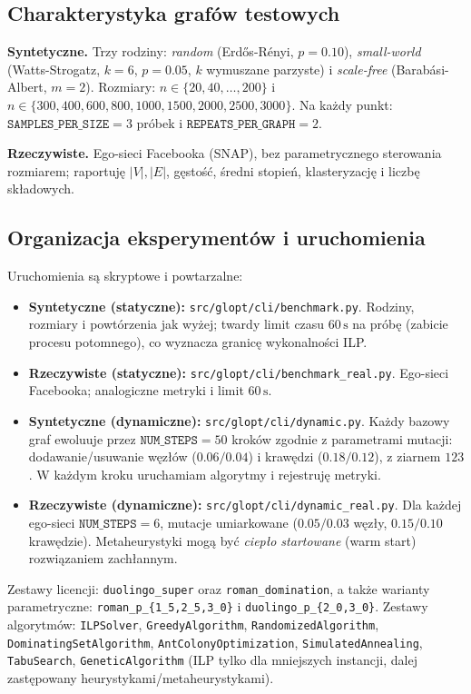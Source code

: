 \subsection{Charakterystyka grafów testowych}

\textbf{Syntetyczne.} Trzy rodziny: \textit{random} (Erdős-Rényi, $p=0{.}10$), \textit{small-world} (Watts-Strogatz, $k=6$, $p=0{.}05$, $k$ wymuszane parzyste) i \textit{scale-free} (Barabási-Albert, $m=2$). Rozmiary: \(n\in\{20,40,\dots,200\}\) i \(n\in\{300,400,600,800,1000,1500,2000,2500,3000\}\). Na każdy punkt: \(\texttt{SAMPLES\_PER\_SIZE}=3\) próbek i \(\texttt{REPEATS\_PER\_GRAPH}=2\).

\textbf{Rzeczywiste.} Ego-sieci Facebooka (SNAP), bez parametrycznego sterowania rozmiarem; raportuję \(|V|,|E|\), gęstość, średni stopień, klasteryzację i liczbę składowych.


\subsection{Organizacja eksperymentów i uruchomienia}\label{subsec:uruchomienia}
Uruchomienia są skryptowe i powtarzalne:
\begin{itemize}
  \item \textbf{Syntetyczne (statyczne):} \texttt{src/glopt/cli/benchmark.py}. Rodziny, rozmiary i powtórzenia jak wyżej; twardy limit czasu \(60\,\mathrm{s}\) na próbę (zabicie procesu potomnego), co wyznacza granicę wykonalności ILP.
  \item \textbf{Rzeczywiste (statyczne):} \texttt{src/glopt/cli/benchmark\_real.py}. Ego-sieci Facebooka; analogiczne metryki i limit \(60\,\mathrm{s}\).
  \item \textbf{Syntetyczne (dynamiczne):} \texttt{src/glopt/cli/dynamic.py}. Każdy bazowy graf ewoluuje przez \(\texttt{NUM\_STEPS}=50\) kroków zgodnie z parametrami mutacji: dodawanie/usuwanie węzłów (\(0{.}06/0{.}04\)) i krawędzi (\(0{.}18/0{.}12\)), z ziarnem \(123\). W każdym kroku uruchamiam algorytmy i rejestruję metryki.
  \item \textbf{Rzeczywiste (dynamiczne):} \texttt{src/glopt/cli/dynamic\_real.py}. Dla każdej ego-sieci \(\texttt{NUM\_STEPS}=6\), mutacje umiarkowane (\(0{.}05/0{.}03\) węzły, \(0{.}15/0{.}10\) krawędzie). Metaheurystyki mogą być \emph{ciepło startowane} (warm start) rozwiązaniem zachłannym.
\end{itemize}

\noindent Zestawy licencji: \texttt{duolingo\_super} oraz \texttt{roman\_domination}, a także warianty parametryczne: \texttt{roman\_p\_\{1\_5,2\_5,3\_0\}} i \texttt{duolingo\_p\_\{2\_0,3\_0\}}. Zestawy algorytmów: \texttt{ILPSolver}, \texttt{GreedyAlgorithm}, \texttt{RandomizedAlgorithm}, \texttt{DominatingSetAlgorithm}, \texttt{AntColonyOptimization}, \texttt{SimulatedAnnealing}, \texttt{TabuSearch}, \texttt{GeneticAlgorithm} (ILP tylko dla mniejszych instancji, dalej zastępowany heurystykami/metaheurystykami).



